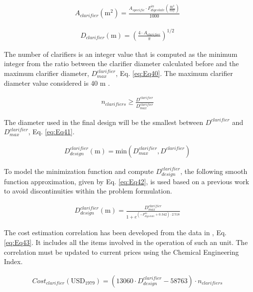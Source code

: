 \begin{refsection}[referencesCh2]
\begin{align}
	{A}_{clarifier} \left( \text{m}^2 \right) = \frac{A_{specific} \cdot F_{digestate}^{in}\left( \frac{\text{m}^3}{\text{day}} \right)}{1000} \label{eq:Eq38}
\end{align}

\begin{align}
	D_{clarifier} \left( \text{m} \right) = \left( \frac{4 \cdot A_{clarifier}}{\pi} \right)^{1/2} \label{eq:Eq39}
\end{align}

The number of clarifiers is an integer value that is computed as the minimum integer from the ratio between the clarifier diameter calculated before and the maximum clarifier diameter, $D_{max}^{clarifier}$, Eq. \ref{eq:Eq40}. The maximum clarifier diameter value considered is 40 m \citep{green2008perry}.

\begin{align}
	{n}_{clarifiers} \ge \frac{D^{clarifier}}{D_{max}^{clarifier}} \label{eq:Eq40}
\end{align}

The diameter used in the final design will be the smallest between $D^{clarifier}$ and $D_{max}^{clarifier}$, Eq. \ref{eq:Eq41}.

\begin{align}
	D_{design}^{clarifier} \left( \text{m} \right) = \text{min}(D_{max}^{clarifier},D^{clarifier}) \label{eq:Eq41}
\end{align}

To model the minimization function and compute $D_{design}^{clarifier}$, the following smooth function approximation, given by Eq. \ref{eq:Eq42}, is used based on a previous work \citep{de2016characterization} to avoid discontinuities within the problem formulation.

\begin{align}
	D_{design}^{clarifier} \left( \text{m} \right) = \frac{D_{max}^{clarifier}}{1 + {e^{\left( -F_{digestate}^{in} + 0.342 \right) \cdot 2.718}}} \label{eq:Eq42}
\end{align}

The cost estimation correlation has been developed from the data in \citet{wef2005wef}, Eq. \ref{eq:Eq43}. It includes all the items involved in the operation of such an unit. The correlation must be updated to current prices using the Chemical Engineering Index.

\begin{align}
	Cost_{clarifier} \left( \text{USD}_{1979} \right) = \left( 13060 \cdot D_{design}^{clarifier} - 58763 \right) \cdot {n}_{clarifiers} \label{eq:Eq43}
\end{align}


\end{refsection}
